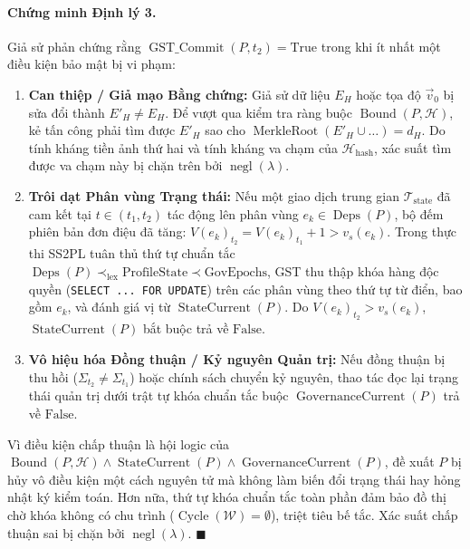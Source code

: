 \documentclass[11pt]{article}
\begin{document}
\paragraph{Chứng minh Định lý 3.}
Giả sử phản chứng rằng $\operatorname{GST\_Commit}(P, t_2) = \text{True}$ trong khi ít nhất một điều kiện bảo mật bị vi phạm:
\begin{enumerate}
    \item \textbf{Can thiệp / Giả mạo Bằng chứng:} Giả sử dữ liệu $E_H$ hoặc tọa độ $\vec{v}_0$ bị sửa đổi thành $E'_H \neq E_H$. Để vượt qua kiểm tra ràng buộc $\operatorname{Bound}(P, \mathcal{H})$, kẻ tấn công phải tìm được $E'_H$ sao cho $\operatorname{MerkleRoot}(E'_H \cup \dots) = d_H$. Do tính kháng tiền ảnh thứ hai và tính kháng va chạm của $\mathcal{H}_{\text{hash}}$, xác suất tìm được va chạm này bị chặn trên bởi $\operatorname{negl}(\lambda)$.
    \item \textbf{Trôi dạt Phân vùng Trạng thái:} Nếu một giao dịch trung gian $\mathcal{T}_{\text{state}}$ đã cam kết tại $t \in (t_1, t_2)$ tác động lên phân vùng $e_k \in \operatorname{Deps}(P)$, bộ đếm phiên bản đơn điệu đã tăng: $V(e_k)_{t_2} = V(e_k)_{t_1} + 1 > v_s(e_k)$. Trong thực thi SS2PL tuân thủ thứ tự chuẩn tắc $\operatorname{Deps}(P) \prec_{\text{lex}} \text{ProfileState} \prec \text{GovEpochs}$, GST thu thập khóa hàng độc quyền (\texttt{SELECT ... FOR UPDATE}) trên các phân vùng theo thứ tự từ điển, bao gồm $e_k$, và đánh giá vị từ $\operatorname{StateCurrent}(P)$. Do $V(e_k)_{t_2} > v_s(e_k)$, $\operatorname{StateCurrent}(P)$ bắt buộc trả về $\text{False}$.
    \item \textbf{Vô hiệu hóa Đồng thuận / Kỷ nguyên Quản trị:} Nếu đồng thuận bị thu hồi ($\Sigma_{t_2} \neq \Sigma_{t_1}$) hoặc chính sách chuyển kỷ nguyên, thao tác đọc lại trạng thái quản trị dưới trật tự khóa chuẩn tắc buộc $\operatorname{GovernanceCurrent}(P)$ trả về $\text{False}$.
\end{enumerate}
Vì điều kiện chấp thuận là hội logic của $\operatorname{Bound}(P, \mathcal{H}) \land \operatorname{StateCurrent}(P) \land \operatorname{GovernanceCurrent}(P)$, đề xuất $P$ bị hủy vô điều kiện một cách nguyên tử mà không làm biến đổi trạng thái hay hỏng nhật ký kiểm toán. Hơn nữa, thứ tự khóa chuẩn tắc toàn phần đảm bảo đồ thị chờ khóa không có chu trình ($\operatorname{Cycle}(\mathcal{W}) = \emptyset$), triệt tiêu bế tắc. Xác suất chấp thuận sai bị chặn bởi $\operatorname{negl}(\lambda)$. $\blacksquare$
\end{document}
